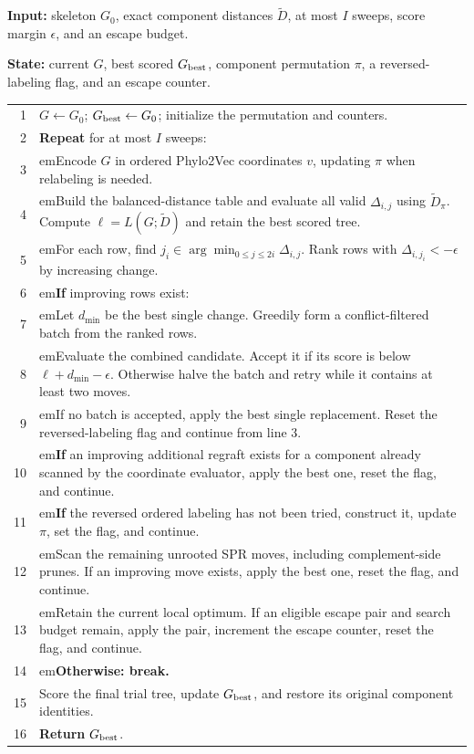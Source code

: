 \documentclass[11pt,a4paper]{article}
\makeatletter
\newcommand{\algindent}[1]{\hangindent=#1em\hangafter=1\hspace*{#1em}}
\DeclareRobustCommand{\_}{\ifmmode\nfss@text{\textunderscore}\else\textunderscore\allowbreak\fi}
\theoremstyle{definition}
\makeatother
\begin{document}
\begin{algorithm}[!htbp]
\caption{Coordinate search on a fixed skeleton (CPU policy)}
\label{alg:coordinate_search}
\small
\textbf{Input:} skeleton $G_0$, exact component distances $\widetilde D$, at most $I$ sweeps, score margin $\epsilon$, and an escape budget.\par
\textbf{State:} current $G$, best scored $G_{\rm best}$, component permutation $\pi$, a reversed-labeling flag, and an escape counter.\par\smallskip
\begin{tabular}{@{}r@{\quad}>{\raggedright\arraybackslash}p{.93\linewidth}@{}}
1 & $G\gets G_0$; $G_{\rm best}\gets G_0$; initialize the permutation and counters.\\
2 & \textbf{Repeat} for at most $I$ sweeps:\\
3 & \algindent{1}Encode $G$ in ordered Phylo2Vec coordinates $v$, updating $\pi$ when relabeling is needed.\\
4 & \algindent{1}Build the balanced-distance table and evaluate all valid $\Delta_{i,j}$ using $\widetilde D_\pi$. Compute $\ell=L(G;\widetilde D)$ and retain the best scored tree.\\
5 & \algindent{1}For each row, find $j_i\in\arg\min_{0\leq j\leq2i}\Delta_{i,j}$. Rank rows with $\Delta_{i,j_i}<-\epsilon$ by increasing change.\\
6 & \algindent{1}\textbf{If} improving rows exist:\\
7 & \algindent{2}Let $d_{\min}$ be the best single change. Greedily form a conflict-filtered batch from the ranked rows.\\
8 & \algindent{2}Evaluate the combined candidate. Accept it if its score is below $\ell+d_{\min}-\epsilon$. Otherwise halve the batch and retry while it contains at least two moves.\\
9 & \algindent{2}If no batch is accepted, apply the best single replacement. Reset the reversed-labeling flag and continue from line 3.\\
10 & \algindent{1}\textbf{If} an improving additional regraft exists for a component already scanned by the coordinate evaluator, apply the best one, reset the flag, and continue.\\
11 & \algindent{1}\textbf{If} the reversed ordered labeling has not been tried, construct it, update $\pi$, set the flag, and continue.\\
12 & \algindent{1}Scan the remaining unrooted SPR moves, including complement-side prunes. If an improving move exists, apply the best one, reset the flag, and continue.\\
13 & \algindent{1}Retain the current local optimum. If an eligible escape pair and search budget remain, apply the pair, increment the escape counter, reset the flag, and continue.\\
14 & \algindent{1}\textbf{Otherwise: break.}\\
15 & Score the final trial tree, update $G_{\rm best}$, and restore its original component identities.\\
16 & \textbf{Return} $G_{\rm best}$.\\
\end{tabular}
\end{algorithm}
\end{document}
